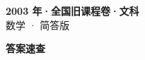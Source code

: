 \documentclass[zihao=-4, a4paper]{ctexart}
\begin{document}
\begin{center}
  {\Large\bfseries 2003 年·全国旧课程卷·文科}\\[4pt]
  {\large 数学 · 简答版}
\end{center}
\medskip
{}

\clearpage
{}
\begin{center}{\Large\bfseries 答案速查}\end{center}
\medskip

\end{document}

